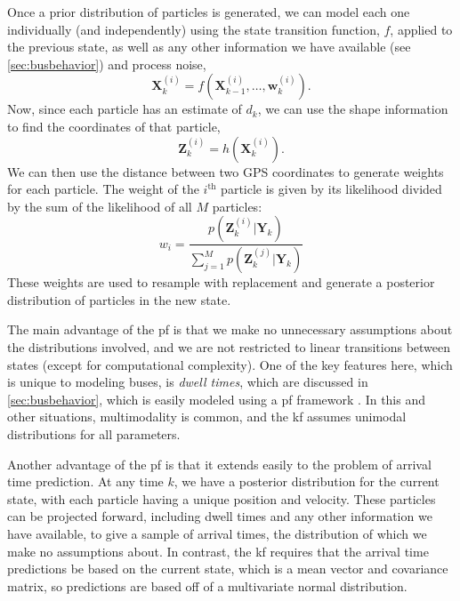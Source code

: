 \documentclass[12pt,a4paper]{article}
\newcommand{\bY}{\mathbf{Y}}
\newcommand{\bX}{\mathbf{X}}
\newcommand{\bZ}{\mathbf{Z}}
\newcommand{\mat}[1]{\mathbf{#1}}
\begin{document}
Once a prior distribution of particles is generated, 
we can model each one individually (and independently) using the state transition function, $f$,
applied to the previous state,
as well as any other information we have available (see \cref{sec:busbehavior}) and process noise,
\begin{equation}
  \label{eq:pf_statetransition}
  \bX_k^{(i)} = f(\bX_{k-1}^{(i)}, \ldots, \mat{w}_k^{(i)}).
\end{equation}
Now, since each particle has an estimate of $d_k$, we can use the shape information to
find the coordinates of that particle,
\begin{equation}
  \label{eq:pf_measurement}
  \bZ_k^{(i)} = h(\bX_k^{(i)}).
\end{equation}
We can then use the distance between two GPS coordinates %
to generate weights for each particle.
The weight of the $i^{\mathrm{th}}$ particle is given by its likelihood divided by the sum of the likelihood
of all $M$ particles:
\begin{equation}
  \label{eq:pf_likelihood}
  w_i = \frac{p(\bZ_k^{(i)} | \bY_k)}{\sum_{j=1}^M p(\bZ_k^{(j)} | \bY_k)}
\end{equation}
These weights are used to resample with replacement and generate a posterior distribution 
of particles in the new state.


The main advantage of the \gls{pf} is that we make no unnecessary assumptions about the distributions
involved, and we are not restricted to linear transitions between states (except for computational
complexity).
One of the key features here, which is unique to modeling buses, 
is \emph{dwell times}, which are discussed in \cref{sec:busbehavior},
which is easily modeled using a \gls{pf} framework \citep{hans-etal:2015,cn}.
In this and other situations, multimodality is common, 
and the \gls{kf} assumes unimodal distributions for all parameters.


Another advantage of the \gls{pf} is that it extends easily to the problem of arrival time prediction.
At any time $k$, we have a posterior distribution for the current state,
with each particle having a unique position and velocity. 
These particles can be projected forward, including dwell times and any other information
we have available, to give a sample of arrival times, the distribution of which we make no assumptions about.
In contrast, the \gls{kf} requires that the arrival time predictions be based on the current state,
which is a mean vector and covariance matrix, so predictions are based off of a multivariate normal distribution.
\end{document}
